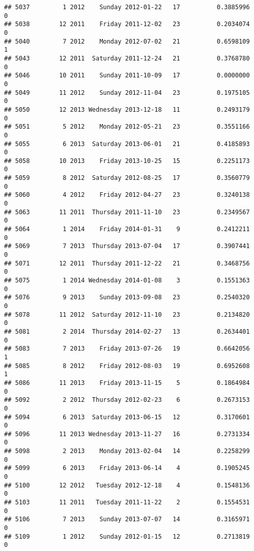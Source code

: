 \documentclass[
]{article}
\begin{document}
\begin{verbatim}
## 5037         1 2012    Sunday 2012-01-22   17          0.3885996             0
## 5038        12 2011    Friday 2011-12-02   23          0.2034074             0
## 5040         7 2012    Monday 2012-07-02   21          0.6598109             1
## 5043        12 2011  Saturday 2011-12-24   21          0.3768780             0
## 5046        10 2011    Sunday 2011-10-09   17          0.0000000             0
## 5049        11 2012    Sunday 2012-11-04   23          0.1975105             0
## 5050        12 2013 Wednesday 2013-12-18   11          0.2493179             0
## 5051         5 2012    Monday 2012-05-21   23          0.3551166             0
## 5055         6 2013  Saturday 2013-06-01   21          0.4185893             0
## 5058        10 2013    Friday 2013-10-25   15          0.2251173             0
## 5059         8 2012  Saturday 2012-08-25   17          0.3560779             0
## 5060         4 2012    Friday 2012-04-27   23          0.3240138             0
## 5063        11 2011  Thursday 2011-11-10   23          0.2349567             0
## 5064         1 2014    Friday 2014-01-31    9          0.2412211             0
## 5069         7 2013  Thursday 2013-07-04   17          0.3907441             0
## 5071        12 2011  Thursday 2011-12-22   21          0.3468756             0
## 5075         1 2014 Wednesday 2014-01-08    3          0.1551363             0
## 5076         9 2013    Sunday 2013-09-08   23          0.2540320             0
## 5078        11 2012  Saturday 2012-11-10   23          0.2134820             0
## 5081         2 2014  Thursday 2014-02-27   13          0.2634401             0
## 5083         7 2013    Friday 2013-07-26   19          0.6642056             1
## 5085         8 2012    Friday 2012-08-03   19          0.6952608             1
## 5086        11 2013    Friday 2013-11-15    5          0.1864984             0
## 5092         2 2012  Thursday 2012-02-23    6          0.2673153             0
## 5094         6 2013  Saturday 2013-06-15   12          0.3170601             0
## 5096        11 2013 Wednesday 2013-11-27   16          0.2731334             0
## 5098         2 2013    Monday 2013-02-04   14          0.2258299             0
## 5099         6 2013    Friday 2013-06-14    4          0.1905245             0
## 5100        12 2012   Tuesday 2012-12-18    4          0.1548136             0
## 5103        11 2011   Tuesday 2011-11-22    2          0.1554531             0
## 5106         7 2013    Sunday 2013-07-07   14          0.3165971             0
## 5109         1 2012    Sunday 2012-01-15   12          0.2713819             0

\end{verbatim}
\end{document}
